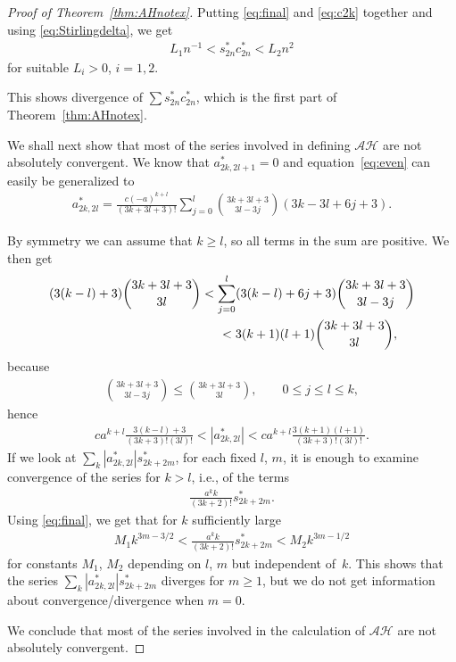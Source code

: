 \documentclass[pdftex]{sigma}
\numberwithin{equation}{section}
\begin{document}
\begin{proof}[Proof of Theorem~\ref{thm:AHnotex}] Putting \eqref{eq:final} and \eqref{eq:c2k} together and using \eqref{eq:Stirlingdelta}, we get
\begin{gather*}
 L_1n^{-1} < s_{2n}^*c_{2n}^* <L_2 n^2
\end{gather*}
for suitable $L_i>0$, $i=1,2$.

This shows divergence of $\sum s_{2n}^*c_{2n}^*$, which is the first part of Theorem~\ref{thm:AHnotex}.

We shall next show that most of the series involved in defining $\mathcal A\mathcal H$ are not absolutely convergent.
We know that $a_{2k,2l+1}^*=0$ and equation~\eqref{eq:even} can easily be generalized to
\begin{gather*}
a_{2k,2l}^*=\frac{c(-a)^{k+l}}{(3k+3l+3)!}\sum_{j=0}^l \binom{3k+3l+3}{3l-3j}(3k-3l+6j+3).
\end{gather*}

By symmetry we can assume that $k\ge l$, so all terms in the sum are positive. We then get
\begin{gather*}
(3(k-l)+3)\binom{3k+3l+3}{3l} < \sum_{j=0}^l (3(k-l)+6j+3)\binom{3k+3l+3}{3l-3j}\\
\hphantom{(3(k-l)+3)\binom{3k+3l+3}{3l}}{} < 3(k+1)(l+1)\binom{3k+3l+3}{3l},
\end{gather*}
because
\begin{gather*}
\binom{3k+3l+3}{3l-3j} \le \binom{3k+3l+3}{3l}, \qquad 0\le j\le l\le k,
\end{gather*}
hence
\begin{gather*}
c a^{k+l}\frac{3(k-l)+3}{(3k+3)!(3l)!}< |a_{2k,2l}^*|<c a^{k+l}\frac{3(k+1)(l+1)}{(3k+3)!(3l)!}.
\end{gather*}
If we look at $\sum_k |a_{2k,2l}^*|s_{2k+2m}^*$, for each fixed $l$, $m$, it is enough to examine convergence of the series for $k>l$, i.e., of the terms
\begin{gather*}
\frac{a^k k}{(3k+2)!}s_{2k+2m}^*.
\end{gather*}
Using \eqref{eq:final}, we get that for $k$ sufficiently large
\begin{gather*}
M_1k^{3m-3/2} < \frac{a^k k}{(3k+2)!}s_{2k+2m}^* < M_2k^{3m-1/2}
\end{gather*}
for constants $M_1$, $M_2$ depending on $l$, $m$ but independent of~$k$. This shows that the series $\sum_k |a_{2k,2l}^*|s_{2k+2m}^*$ diverges for $m\ge 1$, but we do not get information about convergence/diver\-gen\-ce when $m=0$.

We conclude that most of the series involved in the calculation of $\mathcal A\mathcal H$ are not absolutely convergent.
\end{proof}
\end{document}
